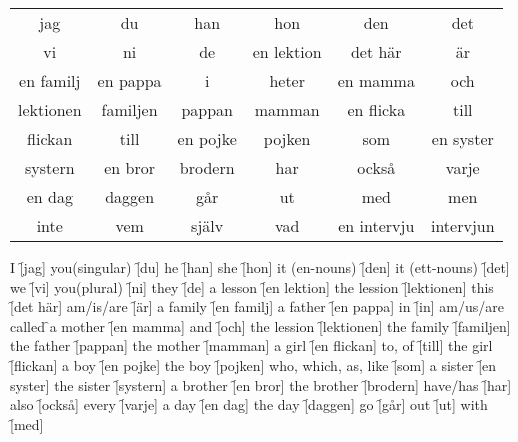 \begin{center}
    \begin{tabular}{|c c c c c c|}
        \hline
        jag & du & han & hon & den & det \\
        vi & ni & de & en lektion & det här & är \\
        en familj & en pappa & i & heter & en mamma & och \\
        lektionen  & familjen & pappan & mamman & en flicka & till \\
        flickan & till & en pojke & pojken & som & en syster \\
        systern & en bror & brodern & har & också & varje \\
        en dag & daggen & går & ut &  med  &  men \\
        inte & vem & själv & vad & en intervju & intervjun \\
        \hline
    \end{tabular}
\end{center}

\begin{questions}
    \begin{multicols}{3}
        \raggedcolumns
        \question I \f[jag]
        \question you(singular) \f[du]
        \question he \f[han]
        \question she \f[hon]
        \question it (en-nouns) \f[den]
        \question it (ett-nouns) \f[det]
        \question we \f[vi]
        \question you(plural) \f[ni]
        \question they \f[de]
        \question a lesson \f[en lektion]
        \question the lession \f[lektionen]
        \question this \f[det här]
        \question am/is/are \f[är]
        \question a family \f[en familj]
        \question a father \f[en pappa]
        \question in \f[in]
        \question am/us/are called \f
        \question a mother \f[en mamma]
        \question and \f[och]
        \question the lession \f[lektionen]
        \question the family \f[familjen]
        \question the father \f[pappan]
        \question the mother \f[mamman]
        \question a girl \f[en flickan]
        \question to, of \f[till]
        \question the girl \f[flickan]
        \question a boy \f[en pojke]
        \question the boy \f[pojken]
        \question who, which, as, like \f[som]
        \question a sister \f[en syster]
        \question the sister \f[systern]
        \question a brother \f[en bror]
        \question the brother \f[brodern]
        \question have/has \f[har]
        \question also \f[också]
        \question every \f[varje]
        \question a day \f[en dag]
        \question the day \f[daggen]
        \question go \f[går]
        \question out \f[ut]
        \question with \f[med]
    \end{multicols}
\end{questions}